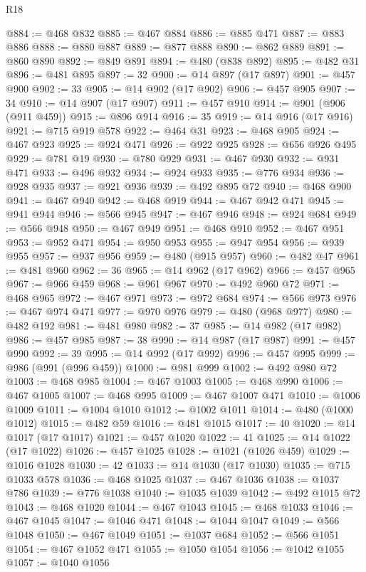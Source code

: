\begin{lexlean}{R18}
\begin{coremodule}
{{{{{{{{{{{{{{{{{{{{{{{{{{{{{{{{{{{{{{{{{{{{{{{{{{{{{{{{{{{{{{{{{{{{{{{{{{{{{{{{{{{{{{{{{{{{{{{{{{{{{{{{{{{{{@884 := @468 @832
@885 := @467 @884
@886 := @885 @471
@887 := @883 @886
@888 := @880 @887
@889 := @877 @888
@890 := @862 @889
@891 := @860 @890
@892 := @849 @891
@894 := @480 (@838 @892)
@895 := @482 @31
@896 := @481 @895
@897 := 32
@900 := @14 @897 (@17 @897)
@901 := @457 @900
@902 := 33
@905 := @14 @902 (@17 @902)
@906 := @457 @905
@907 := 34
@910 := @14 @907 (@17 @907)
@911 := @457 @910
@914 := @901 (@906 (@911 @459))
@915 := @896 @914
@916 := 35
@919 := @14 @916 (@17 @916)
@921 := @715 @919 @578
@922 := @464 @31
@923 := @468 @905
@924 := @467 @923
@925 := @924 @471
@926 := @922 @925
@928 := @656 @926 @495
@929 := @781 @19
@930 := @780 @929
@931 := @467 @930
@932 := @931 @471
@933 := @496 @932
@934 := @924 @933
@935 := @776 @934
@936 := @928 @935
@937 := @921 @936
@939 := @492 @895 @72
@940 := @468 @900
@941 := @467 @940
@942 := @468 @919
@944 := @467 @942 @471
@945 := @941 @944
@946 := @566 @945
@947 := @467 @946
@948 := @924 @684
@949 := @566 @948
@950 := @467 @949
@951 := @468 @910
@952 := @467 @951
@953 := @952 @471
@954 := @950 @953
@955 := @947 @954
@956 := @939 @955
@957 := @937 @956
@959 := @480 (@915 @957)
@960 := @482 @47
@961 := @481 @960
@962 := 36
@965 := @14 @962 (@17 @962)
@966 := @457 @965
@967 := @966 @459
@968 := @961 @967
@970 := @492 @960 @72
@971 := @468 @965
@972 := @467 @971
@973 := @972 @684
@974 := @566 @973
@976 := @467 @974 @471
@977 := @970 @976
@979 := @480 (@968 @977)
@980 := @482 @192
@981 := @481 @980
@982 := 37
@985 := @14 @982 (@17 @982)
@986 := @457 @985
@987 := 38
@990 := @14 @987 (@17 @987)
@991 := @457 @990
@992 := 39
@995 := @14 @992 (@17 @992)
@996 := @457 @995
@999 := @986 (@991 (@996 @459))
@1000 := @981 @999
@1002 := @492 @980 @72
@1003 := @468 @985
@1004 := @467 @1003
@1005 := @468 @990
@1006 := @467 @1005
@1007 := @468 @995
@1009 := @467 @1007 @471
@1010 := @1006 @1009
@1011 := @1004 @1010
@1012 := @1002 @1011
@1014 := @480 (@1000 @1012)
@1015 := @482 @59
@1016 := @481 @1015
@1017 := 40
@1020 := @14 @1017 (@17 @1017)
@1021 := @457 @1020
@1022 := 41
@1025 := @14 @1022 (@17 @1022)
@1026 := @457 @1025
@1028 := @1021 (@1026 @459)
@1029 := @1016 @1028
@1030 := 42
@1033 := @14 @1030 (@17 @1030)
@1035 := @715 @1033 @578
@1036 := @468 @1025
@1037 := @467 @1036
@1038 := @1037 @786
@1039 := @776 @1038
@1040 := @1035 @1039
@1042 := @492 @1015 @72
@1043 := @468 @1020
@1044 := @467 @1043
@1045 := @468 @1033
@1046 := @467 @1045
@1047 := @1046 @471
@1048 := @1044 @1047
@1049 := @566 @1048
@1050 := @467 @1049
@1051 := @1037 @684
@1052 := @566 @1051
@1054 := @467 @1052 @471
@1055 := @1050 @1054
@1056 := @1042 @1055
@1057 := @1040 @1056
}}}}}}}}}}}}}}}}}}}}}}}}}}}}}}}}}}}}}}}}}}}}}}}}}}}}}}}}}}}}}}}}}}}}}}}}}}}}}}}}}}}}}}}}}}}}}}}}}}}}}}}}}}}}}
\end{coremodule}
\end{lexlean}
